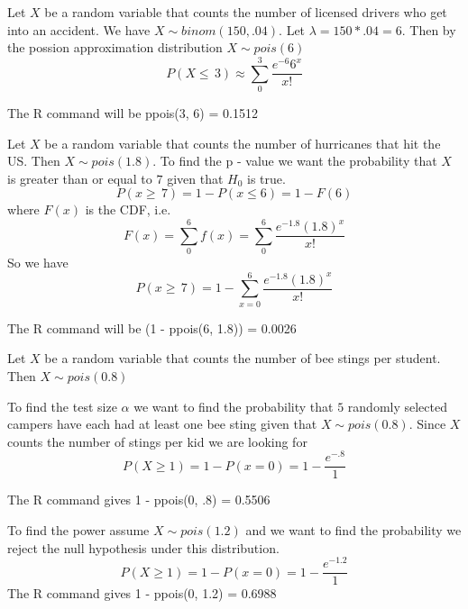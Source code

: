 \documentclass[11pt,largemargins]{homework}
\begin{document}
\newpage
\question 

Let $X$ be a random variable that counts the number of licensed drivers who get into an accident. We have 
$X \sim binom(150, .04)$. Let $\lambda = 150*.04 = 6$. Then by the possion approximation distribution $X \sim pois(6)$
\[P(X \leq\, 3) \approx \sum_0^3 \frac{e^{ - 6} 6^x}{x!} \]


The R command will be ppois(3, 6) = 0.1512


\newpage
\question

Let $X$ be a random variable that counts the number of hurricanes that hit the US. Then $X \sim pois(1.8)$. To find the p - value 
we want the probability that $X$ is greater than or equal to $7$ given that $H_0$ is true. 
\[P(x \geq\, 7) = 1 - P(x \leq 6) = 1 - F(6)\] 
where $F(x)$ is the CDF, i.e. 
\[F(x) = \sum_0^6 f(x) = \sum_0^6 \frac{e^{ - 1.8}(1.8)^x}{x!} \]
So we have 
\[P(x \geq\, 7) = 1 - \sum_{x =0 }^6 \frac{e^{ - 1.8}(1.8)^x}{x!}\]

The R command will be (1 - ppois(6, 1.8)) = 0.0026

\newpage
\question

Let $X$ be a random variable that counts the number of bee stings per student. Then $X \sim pois(0.8)$
\begin{alphaparts}
    \questionpart
    To find the test size $\alpha$ we want to find the probability that $5$ randomly selected campers have each had 
    at least one bee sting given that $X \sim pois(0.8)$. Since $X$ counts the number of stings per kid we are looking for 
    \[P(X \geq 1) = 1 - P(x = 0 ) = 1 - \frac{e^{ - .8}}{1}  \]
    
    The R command gives 1 - ppois(0, .8) =  0.5506

    \questionpart 
    To find the power assume $X \sim pois(1.2)$ and we want to find the probability we reject the null hypothesis under 
    this distribution. 
    \[P(X \geq 1) = 1 - P(x = 0 ) = 1 - \frac{e^{ - 1.2}}{1}\]
    The R command gives 1 - ppois(0, 1.2) =  0.6988

\end{alphaparts}
\end{document}
